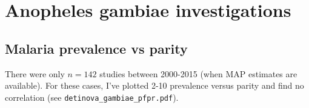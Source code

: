 \documentclass[]{article}
\begin{document}
\section{Anopheles gambiae investigations}
\subsection{Malaria prevalence vs parity}
There were only $n=142$ studies between 2000-2015 (when MAP estimates are available). For these cases, I've plotted 2-10 prevalence versus parity and find no correlation (see \verb|detinova_gambiae_pfpr.pdf|).
\end{document}
